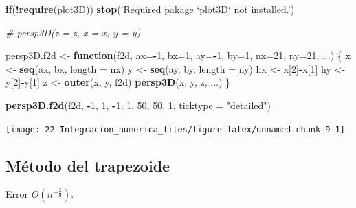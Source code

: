 \documentclass[]{book}
\newenvironment{Shaded}{\begin{snugshade}}{\end{snugshade}}
\newcommand{\KeywordTok}[1]{\textcolor[rgb]{0.13,0.29,0.53}{\textbf{#1}}}
\newcommand{\DataTypeTok}[1]{\textcolor[rgb]{0.13,0.29,0.53}{#1}}
\newcommand{\DecValTok}[1]{\textcolor[rgb]{0.00,0.00,0.81}{#1}}
\newcommand{\StringTok}[1]{\textcolor[rgb]{0.31,0.60,0.02}{#1}}
\newcommand{\CommentTok}[1]{\textcolor[rgb]{0.56,0.35,0.01}{\textit{#1}}}
\newcommand{\ControlFlowTok}[1]{\textcolor[rgb]{0.13,0.29,0.53}{\textbf{#1}}}
\newcommand{\OperatorTok}[1]{\textcolor[rgb]{0.81,0.36,0.00}{\textbf{#1}}}
\newcommand{\NormalTok}[1]{#1}
\theoremstyle{definition}
\theoremstyle{definition}
\theoremstyle{definition}
\theoremstyle{remark}
\begin{document}
\begin{Shaded}
\begin{Highlighting}[]
\ControlFlowTok{if}\NormalTok{(}\OperatorTok{!}\KeywordTok{require}\NormalTok{(plot3D)) }\KeywordTok{stop}\NormalTok{(}\StringTok{'Required pakage `plot3D` not installed.'}\NormalTok{)}

\CommentTok{# persp3D(z = z, x = x, y = y)}

\NormalTok{persp3D.f2d <-}\StringTok{ }\ControlFlowTok{function}\NormalTok{(f2d, }\DataTypeTok{ax=}\OperatorTok{-}\DecValTok{1}\NormalTok{, }\DataTypeTok{bx=}\DecValTok{1}\NormalTok{, }\DataTypeTok{ay=}\OperatorTok{-}\DecValTok{1}\NormalTok{, }\DataTypeTok{by=}\DecValTok{1}\NormalTok{, }\DataTypeTok{nx=}\DecValTok{21}\NormalTok{, }\DataTypeTok{ny=}\DecValTok{21}\NormalTok{, ...) \{ }
\NormalTok{  x <-}\StringTok{ }\KeywordTok{seq}\NormalTok{(ax, bx, }\DataTypeTok{length =}\NormalTok{ nx)}
\NormalTok{  y <-}\StringTok{ }\KeywordTok{seq}\NormalTok{(ay, by, }\DataTypeTok{length =}\NormalTok{ ny)}
\NormalTok{  hx <-}\StringTok{ }\NormalTok{x[}\DecValTok{2}\NormalTok{]}\OperatorTok{-}\NormalTok{x[}\DecValTok{1}\NormalTok{]}
\NormalTok{  hy <-}\StringTok{ }\NormalTok{y[}\DecValTok{2}\NormalTok{]}\OperatorTok{-}\NormalTok{y[}\DecValTok{1}\NormalTok{]}
\NormalTok{  z <-}\StringTok{ }\KeywordTok{outer}\NormalTok{(x, y, f2d)}
  \KeywordTok{persp3D}\NormalTok{(x, y, z, ...)}
\NormalTok{\}}

\KeywordTok{persp3D.f2d}\NormalTok{(f2d, }\OperatorTok{-}\DecValTok{1}\NormalTok{, }\DecValTok{1}\NormalTok{, }\OperatorTok{-}\DecValTok{1}\NormalTok{, }\DecValTok{1}\NormalTok{, }\DecValTok{50}\NormalTok{, }\DecValTok{50}\NormalTok{, }\DecValTok{1}\NormalTok{, }\DataTypeTok{ticktype =} \StringTok{"detailed"}\NormalTok{) }
\end{Highlighting}
\end{Shaded}

\begin{center}\texttt{[image: 22-Integracion\_numerica\_files/figure-latex/unnamed-chunk-9-1]} \end{center}

\subsection{Método del trapezoide}\label{metodo-del-trapezoide-1}

Error \(O(n^{-\frac{2}{d}})\).
\end{document}
